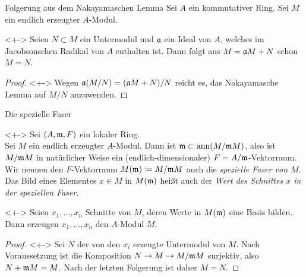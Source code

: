 \begin{frame}{Folgerung aus dem Nakayamaschen Lemma}
	Sei \(A\) ein kommutativer Ring. Sei \(M\) ein endlich erzeugter \(A\)-Modul.
	\begin{corollary}<+->
		Seien \(N \subset M\) ein Untermodul und \(\mathfrak{a}\) ein Ideal von \(A\), welches im
		Jacobsonschen Radikal von \(A\) enthalten ist. Dann folgt aus \(M = \mathfrak{a} M + N\) schon
		\(M = N\).
	\end{corollary}
	\begin{proof}<+->
		Wegen \(\mathfrak{a} (M/N) = (\mathfrak{a} M + N)/N\) reicht es, das Nakayamasche Lemma auf \(M/N\) 
		anzuwenden.
	\end{proof}
\end{frame}

\begin{frame}{Die spezielle Faser}
	\begin{visibleenv}<+->
		Sei \((A, \mathfrak{m}, F)\) ein lokaler Ring.
		\\
		Sei \(M\) ein endlich erzeugter \(A\)-Modul. Dann ist \(\mathfrak{m} \subset \operatorname{ann} (M/\mathfrak{m} M)\), also
		ist \(M/\mathfrak{m} M\) in natürlicher Weise ein (endlich-dimensionaler) \(F = A/\mathfrak{m}\)-Vektorraum.
		\\
		Wir nennen den \(F\)-Vektorraum \(M(\mathfrak{m}) \coloneqq M/\mathfrak{m} M\) auch die \emph{spezielle Faser
		von \(M\)}.
		\\
		Das Bild eines Elementes \(x \in M\) in \(M(\mathfrak{m})\) heißt auch der \emph{Wert des Schnittes
		\(x\) in der speziellen Faser}.
	\end{visibleenv}
	\begin{proposition}<+->
		Seien \(x_1, \dotsc, x_n\) Schnitte von \(M\), deren Werte in \(M(\mathfrak{m})\) eine Basis bilden.
		Dann erzeugen \(x_1, \dotsc, x_n\) den \(A\)-Modul \(M\).
	\end{proposition}
	\begin{proof}<+->
		Sei \(N\) der von den \(x_i\) erzeugte Untermodul von \(M\). Nach Voraussetzung ist die
		Komposition \(N \to M \to M/\mathfrak{m} M\) surjektiv, also \(N + \mathfrak{m} M = M\).
		Nach der letzten Folgerung ist daher \(M = N\).
	\end{proof}
\end{frame}
